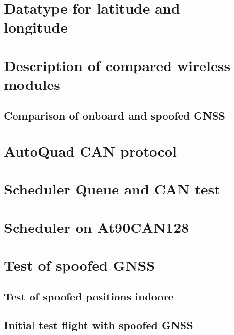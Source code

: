%

\section{Datatype for latitude and longitude}


\section{Description of compared wireless modules} \label{app:wireless_decribe}


\subsection{Comparison of onboard and spoofed GNSS}
\label{app:Comparesion_of_onboard_and_spoofed_GNSS}


\section{AutoQuad CAN protocol} \label{app:aq_can_protocol}


\section{Scheduler Queue and CAN test} \label{app:scheduler_and_can_test}


\section{Scheduler on At90CAN128} \label{app:scheduler_describe}


\section{Test of spoofed GNSS} \label{app:test_of_spoofed_GNSS}


\subsection{Test of spoofed positions indoore}
\label{app:test_of_spoofed_positions_indoore}



\subsection{Initial test flight with spoofed GNSS}
\label{app:test_of_spoofed_positions_outdoore}





